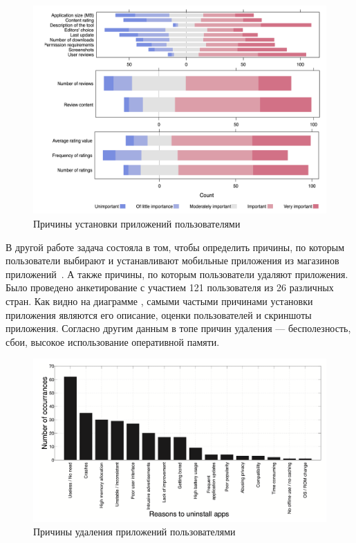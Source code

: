 \documentclass[a4paper,14pt]{extarticle} %
\begin{document}
	\begin{figure}[h]
		\includegraphics[width=\textwidth]{install_reasons}
		\caption{Причины установки приложений пользователями}
		\label{fig:install_reasons}
	\end{figure}
	
	В другой работе задача состояла в том, чтобы определить причины, по которым пользователи выбирают и устанавливают мобильные приложения из магазинов приложений~\parencite{ickin2017users}. А также причины, по которым пользователи удаляют приложения. Было проведено анкетирование с участием 121 пользователя из 26 различных стран. Как видно на диаграмме \ris{\ref{fig:install_reasons}}, самыми частыми причинами установки приложения являются его описание, оценки пользователей и скриншоты приложения. Согласно другим данным \ris{\ref{fig:delete_reasons}} в топе причин удаления — бесполезность, сбои, высокое использование оперативной памяти.
	
	\begin{figure}[h]
		\includegraphics[width=\textwidth]{delete_reasons}
		\caption{Причины удаления приложений пользователями}
		\label{fig:delete_reasons}
	\end{figure}
	
\end{document}
